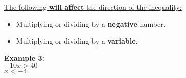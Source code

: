 \documentclass[12pt,fleqn]{book} %
\begin{document}
\vspace*{-3mm}

\pagebreak

\begin{center}
    \noindent \underline{The following \textbf{will affect} the direction of the inequality:}
    \begin{multicols}{2}
        \begin{itemize}
            \item Multiplying or dividing by a \textbf{negative} number.
            \item Multiplying or dividing by a \textbf{variable}.
        \end{itemize}
        \columnbreak
        \textbf{Example 3:}\\
        $-10x > 40$\\
        $x<-4$
    \end{multicols}
\end{center}
\end{document}
